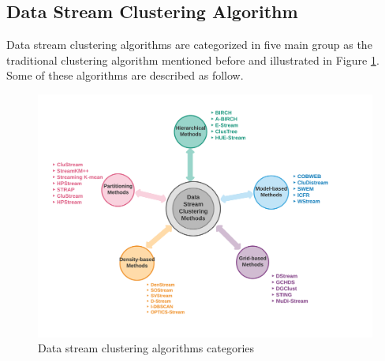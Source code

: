 \documentclass[../UNBThesis2.tex]{subfiles}
\begin{document}
\subsection{Data Stream Clustering Algorithm}
Data stream clustering algorithms are categorized in five main group as the traditional clustering algorithm mentioned before and illustrated in Figure \ref{method}. Some of these algorithms are described as follow.


\begin{figure}
    \centering
    \includegraphics[width = 12 cm]{image/Chapters/Chapter2/streammethod.png}
    \caption{Data stream clustering algorithms categories}
    \label{method}
\end{figure}
\end{document}
